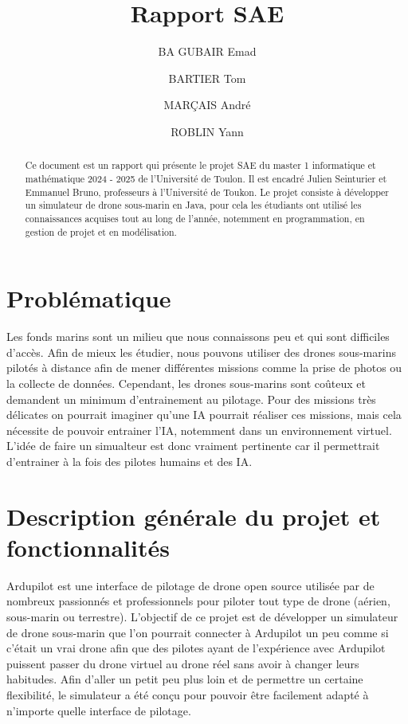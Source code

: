 \documentclass{scrartcl}
\title{Rapport SAE}
\author{BA GUBAIR Emad \and BARTIER Tom \and MARÇAIS André \and ROBLIN Yann}
\begin{document}
\maketitle{}

\begin{abstract}
    Ce document est un rapport qui présente le projet SAE du master 1 informatique et mathématique 2024 - 2025
    de l'Université de Toulon. Il est encadré Julien Seinturier et Emmanuel Bruno, professeurs à l'Université de Toukon.
    Le projet consiste à développer un simulateur de drone sous-marin en Java, pour cela les étudiants
    ont utilisé les connaissances acquises tout au long de l'année, notemment en programmation, en gestion de projet et
    en modélisation.
\end{abstract}

\section{Problématique}
Les fonds marins sont un milieu que nous connaissons peu et qui sont difficiles d'accès.
Afin de mieux les étudier, nous pouvons utiliser des drones sous-marins pilotés à distance
afin de mener différentes missions comme la prise de photos ou la collecte de données.
Cependant, les drones sous-marins sont coûteux et demandent un minimum d'entrainement au pilotage.
Pour des missions très délicates on pourrait imaginer qu'une IA pourrait réaliser ces missions, mais cela
nécessite de pouvoir entrainer l'IA, notemment dans un environnement virtuel. L'idée de faire un simualteur
est donc vraiment pertinente car il permettrait d'entrainer à la fois des pilotes humains et des IA.

\section {Description générale du projet et fonctionnalités}

Ardupilot est une interface de pilotage de drone open source utilisée par de nombreux passionnés et professionnels
pour piloter tout type de drone (aérien, sous-marin ou terrestre). L'objectif de ce projet est de développer un simulateur
de drone sous-marin que l'on pourrait connecter à Ardupilot un peu comme si c'était un vrai drone afin que des pilotes ayant de l'expérience
avec Ardupilot puissent passer du drone virtuel au drone réel sans avoir à changer leurs habitudes. Afin d'aller un petit peu plus loin et de permettre
un certaine flexibilité, le simulateur a été conçu pour pouvoir être facilement adapté à n'importe quelle interface de pilotage.
\end{document}
